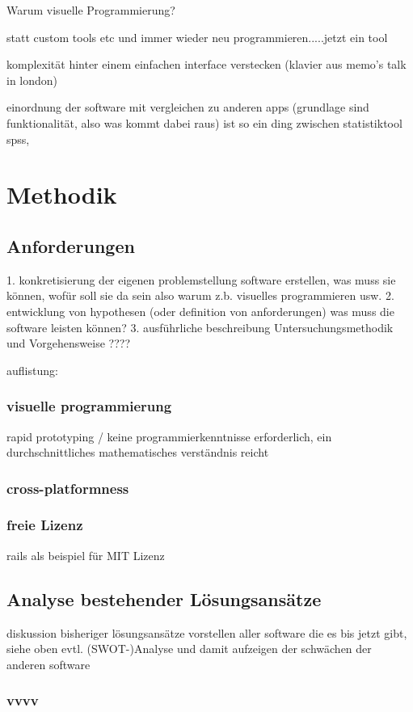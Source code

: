 \documentclass[a4paper, 12pt, onepage, pdftex, headsepline, footsepline]{scrreprt}
\begin{document}
Warum visuelle Programmierung?

statt custom tools etc und immer wieder neu programmieren.....jetzt ein tool

komplexität hinter einem einfachen interface verstecken (klavier aus memo’s talk in london)

einordnung der software mit vergleichen zu anderen apps (grundlage sind funktionalität, also was kommt dabei raus) ist so ein ding zwischen statistiktool spss, 

\chapter{Methodik}
\section{Anforderungen}
1. konkretisierung der eigenen problemstellung
software erstellen, was muss sie können, wofür soll sie da sein
also warum z.b. visuelles programmieren usw.
2. entwicklung von hypothesen (oder definition von anforderungen)
was muss die software leisten können?
3. ausführliche beschreibung Untersuchungsmethodik und Vorgehensweise
????

auflistung:
\subsection{visuelle programmierung}
rapid prototyping / keine programmierkenntnisse erforderlich, ein durchschnittliches mathematisches verständnis reicht
\subsection{cross-platformness}
\subsection{freie Lizenz}
rails als beispiel für MIT Lizenz

\section{Analyse bestehender Lösungsansätze}
diskussion bisheriger lösungsansätze
vorstellen aller software die es bis jetzt gibt, siehe oben
evtl. (SWOT-)Analyse und damit aufzeigen der schwächen der anderen software
\subsection{vvvv}
\end{document}
